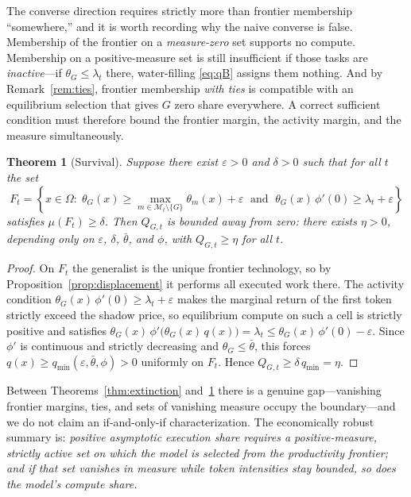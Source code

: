 \documentclass[11pt]{article}
\newtheorem{theorem}{Theorem}
\theoremstyle{definition}
\theoremstyle{remark}
\begin{document}
The converse direction requires strictly more than frontier membership ``somewhere,'' and it is worth recording why the naive converse is false. Membership of the frontier on a \emph{measure-zero} set supports no compute. Membership on a positive-measure set is still insufficient if those tasks are \emph{inactive}---if $\theta_G \le \lambda_t$ there, water-filling \eqref{eq:qB} assigns them nothing. And by Remark~\ref{rem:ties}, frontier membership \emph{with ties} is compatible with an equilibrium selection that gives $G$ zero share everywhere. A correct sufficient condition must therefore bound the frontier margin, the activity margin, and the measure simultaneously.

\begin{theorem}[Survival]
\label{thm:survival}
Suppose there exist $\varepsilon > 0$ and $\delta > 0$ such that for all $t$ the set
\begin{equation}
F_t = \left\{ x \in \Omega :\;
\theta_G(x) \ge \max_{m \in \mathcal{M}_t \setminus \{G\}} \theta_m(x) + \varepsilon
\;\text{ and }\;
\theta_G(x)\, \phi'(0) \ge \lambda_t + \varepsilon
\right\}
\end{equation}
satisfies $\mu(F_t) \ge \delta$. Then $Q_{G,t}$ is bounded away from zero: there exists $\eta > 0$, depending only on $\varepsilon$, $\delta$, $\bar\theta$, and $\phi$, with $Q_{G,t} \ge \eta$ for all $t$.
\end{theorem}

\begin{proof}
On $F_t$ the generalist is the unique frontier technology, so by Proposition~\ref{prop:displacement} it performs all executed work there. The activity condition $\theta_G(x)\,\phi'(0) \ge \lambda_t + \varepsilon$ makes the marginal return of the first token strictly exceed the shadow price, so equilibrium compute on such a cell is strictly positive and satisfies $\theta_G(x)\, \phi'\!\big(\theta_G(x)\, q(x)\big) = \lambda_t \le \theta_G(x)\,\phi'(0) - \varepsilon$. Since $\phi'$ is continuous and strictly decreasing and $\theta_G \le \bar\theta$, this forces $q(x) \ge q_{\min}(\varepsilon, \bar\theta, \phi) > 0$ uniformly on $F_t$. Hence $Q_{G,t} \ge \delta\, q_{\min} = \eta$.
\end{proof}

Between Theorems~\ref{thm:extinction} and~\ref{thm:survival} there is a genuine gap---vanishing frontier margins, ties, and sets of vanishing measure occupy the boundary---and we do not claim an if-and-only-if characterization. The economically robust summary is: \emph{positive asymptotic execution share requires a positive-measure, strictly active set on which the model is selected from the productivity frontier; and if that set vanishes in measure while token intensities stay bounded, so does the model's compute share.}
\end{document}

